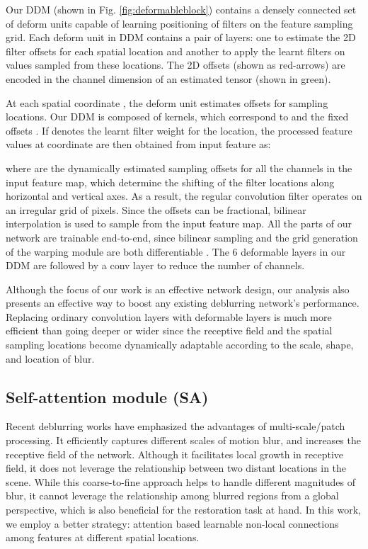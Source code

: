 \documentclass[letterpaper]{article} \usepackage{aaai20}  \usepackage{times}  \usepackage{helvet} \usepackage{courier}  \usepackage[hyphens]{url}  \usepackage{graphicx} \urlstyle{rm} \def\UrlFont{\rm}  \usepackage{graphicx}  \frenchspacing  \setlength{\pdfpagewidth}{8.5in}  \setlength{\pdfpageheight}{11in}
\begin{document}
Our DDM (shown in Fig. \ref{fig:deformableblock}) contains a densely connected set of deform units capable of learning positioning of filters on the feature sampling grid. Each deform unit in DDM contains a pair of layers: one to estimate the 2D filter offsets for each spatial location and another to apply the learnt filters on values sampled from these locations. The 2D offsets (shown as red-arrows) are encoded in the channel dimension of an estimated tensor (shown in green).

At each spatial coordinate , the deform unit estimates  offsets for  sampling locations. Our DDM is composed of  kernels, which correspond to  and the fixed offsets . If  denotes the learnt filter weight for the  location, the processed feature values  at coordinate  are then obtained from input feature  as:

where  are the dynamically estimated sampling offsets for all the channels in the input feature map, which determine the shifting of the  filter locations along horizontal and vertical axes. As a result, the regular convolution filter operates on an irregular grid of pixels. Since the offsets can be fractional, bilinear interpolation is used to sample from the input feature map. All the parts of our network are trainable end-to-end, since bilinear sampling and the grid generation of the warping module are both differentiable \cite{paszke2017automatic}. The 6 deformable layers in our DDM are followed by a  conv layer to reduce the number of channels. 


Although the focus of our work is an effective network design, our analysis also presents an effective way to boost any existing deblurring network's performance. Replacing ordinary convolution layers with deformable layers is much more efficient than going deeper or wider since the receptive field and the spatial sampling locations become dynamically adaptable according to the scale, shape, and location of blur.
 
 


\subsection{Self-attention module (SA)}

Recent deblurring works have emphasized the advantages of multi-scale/patch processing. It efficiently captures different scales of motion blur, and increases the receptive field of the network. Although it facilitates local growth in receptive field, it does not leverage the relationship between two distant locations in the scene. While this coarse-to-fine approach helps to handle different magnitudes of blur, it cannot leverage the relationship among blurred regions from a global perspective, which is also beneficial for the restoration task at hand. In this work, we employ a better strategy: attention based learnable non-local connections among features at different spatial locations.
\end{document}
